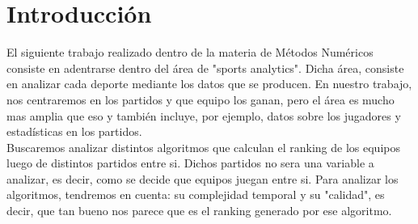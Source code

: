 \section{Introducción}

El siguiente trabajo realizado dentro de la materia de M\'etodos Num\'ericos consiste en adentrarse dentro del \'area de "sports analytics". Dicha \'area, consiste en analizar cada deporte mediante los datos que se producen. En nuestro trabajo, nos centraremos en los partidos y que equipo los ganan, pero el \'area es mucho mas amplia que eso y tambi\'en incluye, por ejemplo, datos sobre los jugadores y estad\'isticas en los partidos.\\
Buscaremos analizar distintos algoritmos que calculan el ranking de los equipos luego de distintos partidos entre si. Dichos partidos no sera una variable a analizar, es decir, como se decide que equipos juegan entre si. Para analizar los algoritmos, tendremos en cuenta: su complejidad temporal y su "calidad", es decir, que tan bueno nos parece que es el ranking generado por ese algoritmo.